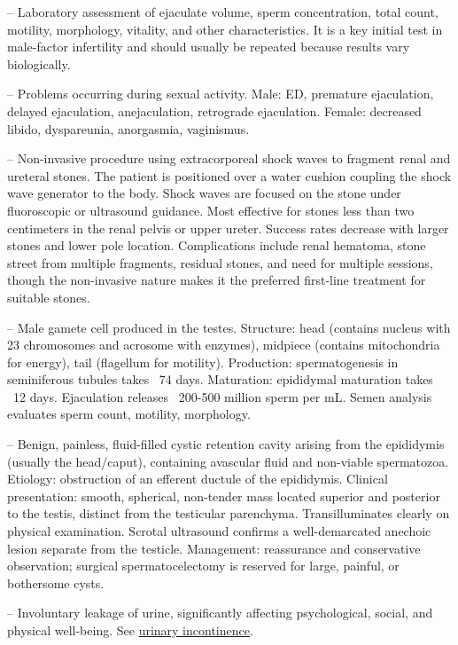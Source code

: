 -- Laboratory assessment of ejaculate volume, sperm concentration, total count, motility, morphology, vitality, and other characteristics. It is a key initial test in male-factor infertility and should usually be repeated because results vary biologically.

-- Problems occurring during sexual activity. Male: ED, premature ejaculation, delayed ejaculation, anejaculation, retrograde ejaculation. Female: decreased libido, dyspareunia, anorgasmia, vaginismus.

-- Non-invasive procedure using extracorporeal shock waves to fragment renal and ureteral stones. The patient is positioned over a water cushion coupling the shock wave generator to the body. Shock waves are focused on the stone under fluoroscopic or ultrasound guidance. Most effective for stones less than two centimeters in the renal pelvis or upper ureter. Success rates decrease with larger stones and lower pole location. Complications include renal hematoma, stone street from multiple fragments, residual stones, and need for multiple sessions, though the non-invasive nature makes it the preferred first-line treatment for suitable stones.

-- Male gamete cell produced in the testes. Structure: head (contains nucleus with 23 chromosomes and acrosome with enzymes), midpiece (contains mitochondria for energy), tail (flagellum for motility). Production: spermatogenesis in seminiferous tubules takes ~74 days. Maturation: epididymal maturation takes ~12 days. Ejaculation releases ~200-500 million sperm per mL. Semen analysis evaluates sperm count, motility, morphology.

-- Benign, painless, fluid-filled cystic retention cavity arising from the epididymis (usually the head/caput), containing avascular fluid and non-viable spermatozoa. Etiology: obstruction of an efferent ductule of the epididymis. Clinical presentation: smooth, spherical, non-tender mass located superior and posterior to the testis, distinct from the testicular parenchyma. Transilluminates clearly on physical examination. Scrotal ultrasound confirms a well-demarcated anechoic lesion separate from the testicle. Management: reassurance and conservative observation; surgical spermatocelectomy is reserved for large, painful, or bothersome cysts.

-- Involuntary leakage of urine, significantly affecting psychological, social, and physical well-being. See \hyperlink{Urinary Incontinence}{urinary incontinence}.

